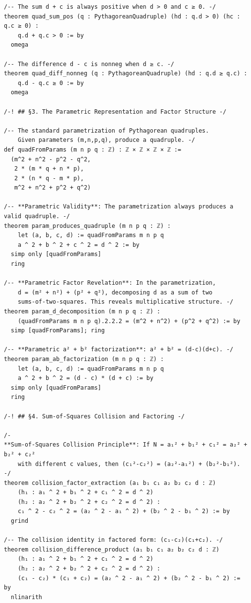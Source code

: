 \documentclass[11pt,openany]{book}
\theoremstyle{definition}
\theoremstyle{plain}
\theoremstyle{remark}
\begin{document}
\begin{lstlisting}[style=lean]
/-- The sum d + c is always positive when d > 0 and c ≥ 0. -/
theorem quad_sum_pos (q : PythagoreanQuadruple) (hd : q.d > 0) (hc : q.c ≥ 0) :
    q.d + q.c > 0 := by
  omega

/-- The difference d - c is nonneg when d ≥ c. -/
theorem quad_diff_nonneg (q : PythagoreanQuadruple) (hd : q.d ≥ q.c) :
    q.d - q.c ≥ 0 := by
  omega

/-! ## §3. The Parametric Representation and Factor Structure -/

/-- The standard parametrization of Pythagorean quadruples.
    Given parameters (m,n,p,q), produce a quadruple. -/
def quadFromParams (m n p q : ℤ) : ℤ × ℤ × ℤ × ℤ :=
  (m^2 + n^2 - p^2 - q^2,
   2 * (m * q + n * p),
   2 * (n * q - m * p),
   m^2 + n^2 + p^2 + q^2)

/-- **Parametric Validity**: The parametrization always produces a valid quadruple. -/
theorem param_produces_quadruple (m n p q : ℤ) :
    let (a, b, c, d) := quadFromParams m n p q
    a ^ 2 + b ^ 2 + c ^ 2 = d ^ 2 := by
  simp only [quadFromParams]
  ring

/-- **Parametric Factor Revelation**: In the parametrization,
    d = (m² + n²) + (p² + q²), decomposing d as a sum of two
    sums-of-two-squares. This reveals multiplicative structure. -/
theorem param_d_decomposition (m n p q : ℤ) :
    (quadFromParams m n p q).2.2.2 = (m^2 + n^2) + (p^2 + q^2) := by
  simp [quadFromParams]; ring

/-- **Parametric a² + b² factorization**: a² + b² = (d-c)(d+c). -/
theorem param_ab_factorization (m n p q : ℤ) :
    let (a, b, c, d) := quadFromParams m n p q
    a ^ 2 + b ^ 2 = (d - c) * (d + c) := by
  simp only [quadFromParams]
  ring

/-! ## §4. Sum-of-Squares Collision and Factoring -/

/-
**Sum-of-Squares Collision Principle**: If N = a₁² + b₁² + c₁² = a₂² + b₂² + c₂²
    with different c values, then (c₁²-c₂²) = (a₂²-a₁²) + (b₂²-b₁²).
-/
theorem collision_factor_extraction (a₁ b₁ c₁ a₂ b₂ c₂ d : ℤ)
    (h₁ : a₁ ^ 2 + b₁ ^ 2 + c₁ ^ 2 = d ^ 2)
    (h₂ : a₂ ^ 2 + b₂ ^ 2 + c₂ ^ 2 = d ^ 2) :
    c₁ ^ 2 - c₂ ^ 2 = (a₂ ^ 2 - a₁ ^ 2) + (b₂ ^ 2 - b₁ ^ 2) := by
  grind

/-- The collision identity in factored form: (c₁-c₂)(c₁+c₂). -/
theorem collision_difference_product (a₁ b₁ c₁ a₂ b₂ c₂ d : ℤ)
    (h₁ : a₁ ^ 2 + b₁ ^ 2 + c₁ ^ 2 = d ^ 2)
    (h₂ : a₂ ^ 2 + b₂ ^ 2 + c₂ ^ 2 = d ^ 2) :
    (c₁ - c₂) * (c₁ + c₂) = (a₂ ^ 2 - a₁ ^ 2) + (b₂ ^ 2 - b₁ ^ 2) := by
  nlinarith


\end{lstlisting}
\end{document}
